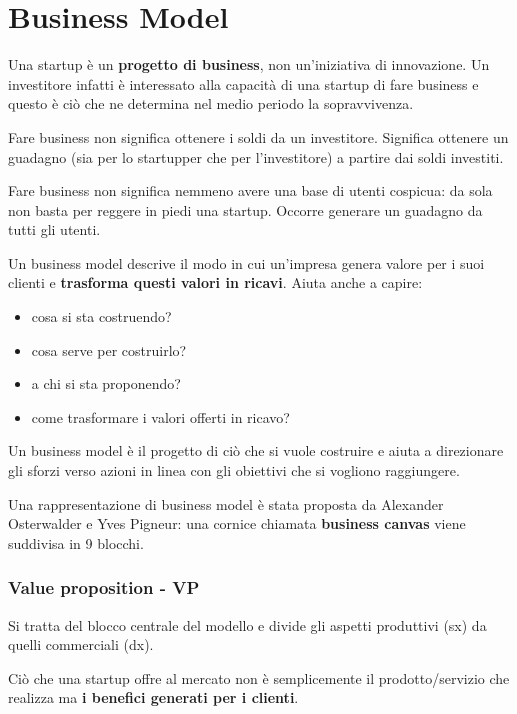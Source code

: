 \newpage
\chapter{Business Model}

Una startup è un \textbf{progetto di business}, non un'iniziativa di
innovazione.
Un investitore infatti è interessato alla capacità di una startup di
fare business e questo è ciò che ne determina nel medio periodo la
sopravvivenza.

Fare business non significa ottenere i soldi da un investitore. Significa
ottenere un guadagno (sia per lo startupper che per l'investitore) a partire
dai soldi investiti.

Fare business non significa nemmeno avere una base di utenti cospicua: da
sola non basta per reggere in piedi una startup. Occorre generare un guadagno
da tutti gli utenti.

Un business model descrive il modo in cui un'impresa genera valore per i suoi
clienti e \textbf{trasforma questi valori in ricavi}. Aiuta anche a capire:

\begin{itemize}

\item cosa si sta costruendo?

\item cosa serve per costruirlo?

\item a chi si sta proponendo?

\item come trasformare i valori offerti in ricavo?

\end{itemize}

Un business model è il progetto di ciò che si vuole costruire e aiuta a
direzionare gli sforzi verso azioni in linea con gli obiettivi che si vogliono
raggiungere.

Una rappresentazione di business model è stata proposta da Alexander
Osterwalder e Yves Pigneur: una cornice chiamata \textbf{business canvas} viene
suddivisa in 9 blocchi.

\subsection{Value proposition - VP}

Si tratta del blocco centrale del modello e divide gli aspetti produttivi (sx)
da quelli commerciali (dx).

Ciò che una startup offre al mercato non è semplicemente il prodotto/servizio
che realizza ma \textbf{i benefici generati per i clienti}.

